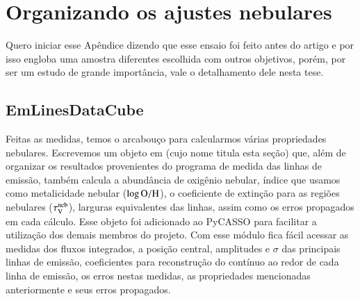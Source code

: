 

\chapter{Organizando os ajustes nebulares}
\label{apendice:EmLinesDataCube}

Quero iniciar esse Apêndice dizendo que esse ensaio foi feito antes do artigo \citet{Lacerda.etal.2018} e por isso engloba uma amostra diferentes escolhida com outros objetivos, porém, por ser um estudo de grande importância, vale o detalhamento dele nesta tese.


\section{EmLinesDataCube}
\label{apendice:EmLinesDataCube:EMLDC}

Feitas as medidas, temos o arcabouço para calcularmos várias propriedades nebulares. Escrevemos um objeto em \pyt (cujo nome titula esta seção) que, além de organizar os resultados provenientes do programa de medida das linhas de emissão, também calcula a abundância de oxigênio nebular, índice que usamos como metalicidade nebular ($\log {\rm O}/{\rm H}$), o coeficiente de extinção para as regiões nebulares ($\tau_{\mathrm{V}}^{\mathrm{neb}}$), larguras equivalentes das linhas, assim como os erros propagados em cada cálculo. Esse objeto foi adicionado ao PyCASSO para facilitar a utilização dos demais membros do projeto. Com esse módulo fica fácil acessar as medidas dos fluxos integrados, a posição central, amplitudes e $\sigma$ das principais linhas de emissão, coeficientes para reconstrução do contínuo ao redor de cada linha de emissão, os erros nestas medidas, as propriedades mencionadas anteriormente e seus erros propagados.

